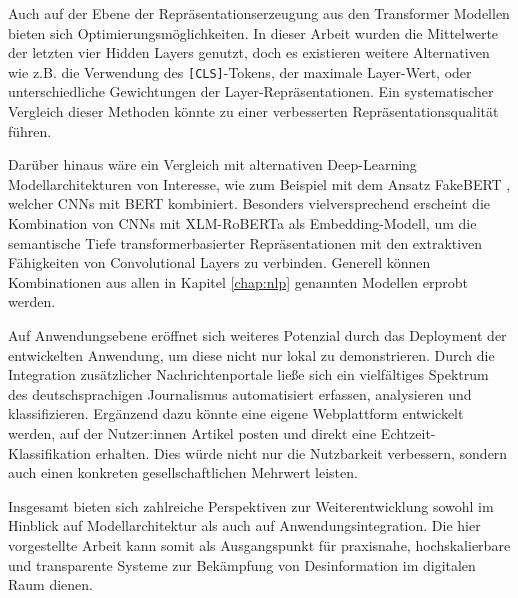 Auch auf der Ebene der Repräsentationserzeugung aus den Transformer Modellen bieten sich Optimierungsmöglichkeiten. 
In dieser Arbeit wurden die Mittelwerte der letzten vier Hidden Layers genutzt, doch es existieren weitere Alternativen wie z.B. die Verwendung des 
\texttt{[CLS]}-Tokens, der maximale Layer-Wert, oder unterschiedliche Gewichtungen der Layer-Repräsentationen. 
Ein systematischer Vergleich dieser Methoden könnte zu einer verbesserten Repräsentationsqualität führen.

Darüber hinaus wäre ein Vergleich mit alternativen Deep-Learning Modellarchitekturen von Interesse, wie zum Beispiel mit dem Ansatz FakeBERT \cite{Kaliyar:2021aa}, 
welcher CNNs mit BERT kombiniert. Besonders vielversprechend erscheint die Kombination von CNNs mit XLM-RoBERTa als Embedding-Modell,
um die semantische Tiefe transformerbasierter Repräsentationen mit den extraktiven Fähigkeiten von Convolutional Layers zu verbinden.
Generell können Kombinationen aus allen in Kapitel \ref{chap:nlp} genannten Modellen erprobt werden.

Auf Anwendungsebene eröffnet sich weiteres Potenzial durch das Deployment der entwickelten Anwendung, um diese nicht nur lokal zu demonstrieren.
Durch die Integration zusätzlicher Nachrichtenportale ließe sich ein vielfältiges Spektrum des deutschsprachigen Journalismus automatisiert erfassen, 
analysieren und klassifizieren.
Ergänzend dazu könnte eine eigene Webplattform entwickelt werden, auf der Nutzer:innen Artikel posten und direkt eine Echtzeit-Klassifikation 
erhalten. Dies würde nicht nur die Nutzbarkeit verbessern, sondern auch einen konkreten gesellschaftlichen Mehrwert leisten.

Insgesamt bieten sich zahlreiche Perspektiven zur Weiterentwicklung sowohl im Hinblick auf Modellarchitektur als auch auf Anwendungsintegration. 
Die hier vorgestellte Arbeit kann somit als Ausgangspunkt für praxisnahe, hochskalierbare und transparente Systeme zur Bekämpfung von Desinformation 
im digitalen Raum dienen.

